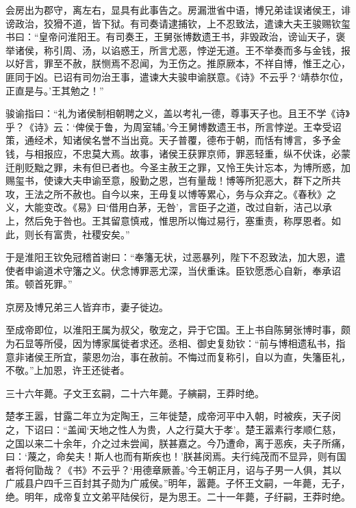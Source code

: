 \documentclass[12pt,UTF8]{ctexbook}
\begin{document}
会房出为郡守，离左右，显具有此事告之。房漏泄省中语，博兄弟诖误诸侯王，诽谤政治，狡猾不道，皆下狱。有司奏请逮捕钦，上不忍致法，遣谏大夫王骏赐钦玺书曰：“皇帝问淮阳王。有司奏王，王舅张博数遗王书，非毁政治，谤讪天子，褒举诸侯，称引周、汤，以谄惑王，所言尤恶，悖逆无道。王不举奏而多与金钱，报以好言，罪至不赦，朕恻焉不忍闻，为王伤之。推原厥本，不祥自博，惟王之心，匪同于凶。已诏有司勿治王事，遣谏大夫骏申谕朕意。《诗》不云乎？‘靖恭尔位，正直是与。’王其勉之！”



骏谕指曰：“礼为诸侯制相朝聘之义，盖以考礼一德，尊事天子也。且王不学《诗》乎？《诗》云：‘俾侯于鲁，为周室辅。’今王舅博数遗王书，所言悖逆。王幸受诏策，通经术，知诸侯名誉不当出竟。天子普覆，德布于朝，而恬有博言，多予金钱，与相报应，不忠莫大焉。故事，诸侯王获罪京师，罪恶轻重，纵不伏诛，必蒙迁削贬黜之罪，未有但已者也。今圣主赦王之罪，又怜王失计忘本，为博所惑，加赐玺书，使谏大夫申谕至意，殷勤之恩，岂有量哉！博等所犯恶大，群下之所共攻，王法之所不赦也。自今以来，王毋复以博等累心，务与众弃之。《春秋》之义，大能变改。《易》曰‘借用白茅，无咎’，言臣子之道，改过自新，洁己以承上，然后免于咎也。王其留意慎戒，惟思所以悔过易行，塞重责，称厚恩者。如此，则长有富贵，社稷安矣。”



于是淮阳王钦免冠稽首谢曰：“奉籓无状，过恶暴列，陛下不忍致法，加大恩，遣使者申谕道术守籓之义。伏念博罪恶尤深，当伏重诛。臣钦愿悉心自新，奉承诏策。顿首死罪。”



京房及博兄弟三人皆弃市，妻子徙边。



至成帝即位，以淮阳王属为叔父，敬宠之，异于它国。王上书自陈舅张博时事，颇为石显等所侵，因为博家属徙者求还。丞相、御史复劾钦：“前与博相遗私书，指意非诸侯王所宜，蒙恩勿治，事在赦前。不悔过而复称引，自以为直，失籓臣礼，不敬。”上加恩，许王还徙者。



三十六年薨。子文王玄嗣，二十六年薨。子縯嗣，王莽时绝。



楚孝王嚣，甘露二年立为定陶王，三年徙楚，成帝河平中入朝，时被疾，天子闵之，下诏曰：“盖闻‘天地之性人为贵，人之行莫大于孝’。楚王嚣素行孝顺仁慈，之国以来二十余年，介之过未尝闻，朕甚嘉之。今乃遭命，离于恶疾，夫子所痛，曰：‘蔑之，命矣夫！斯人也而有斯疾也！’朕甚闵焉。夫行纯茂而不显异，则有国者将何勖哉？《书》不云乎？‘用德章厥善。’今王朝正月，诏与子男一人俱，其以广戚县户四千三百封其子勋为广戚侯。”明年，嚣薨。子怀王文嗣，一年薨，无子，绝。明年，成帝复立文弟平陆侯衍，是为思王。二十一年薨，子纡嗣，王莽时绝。
\end{document}
